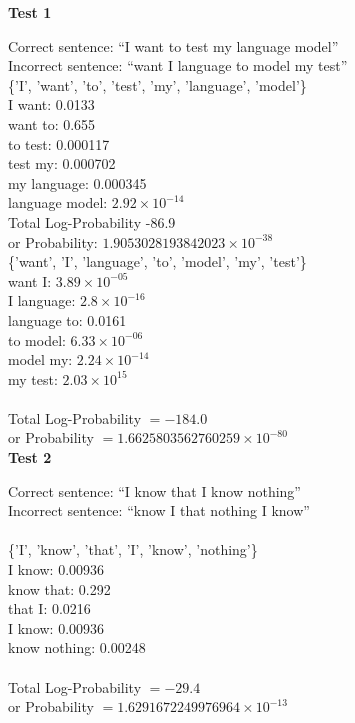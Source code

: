 \documentclass[12pt]{article}
\begin{document}
\textbf{Test 1}

Correct sentence: \enquote{I want to test my language model} \\
Incorrect sentence: \enquote{want I language to model my test} \\


\{'I', 'want', 'to', 'test', 'my', 'language', 'model'\} \\
I want: 0.0133 \\
want to: 0.655 \\
to test: 0.000117 \\
test my: 0.000702 \\
my language: 0.000345 \\
language model: $2.92 \times 10^{-14}$
\\

 Total Log-Probability -86.9 \\
or Probability: $1.9053028193842023 \times 10^{-38} $ \\

\{'want', 'I', 'language', 'to', 'model', 'my', 'test'\} \\
want I: $3.89 \times 10^{-05}$ \\
I language: $2.8\times 10^{-16}$ \\
language to: 0.0161 \\
to model: $6.33\times 10^{-06}$ \\
model my: $2.24\times 10^{-14}$ \\
my test: $2.03\times 10^{15}$ \\
\\
 Total Log-Probability $= -184.0$ \\
or Probability $= 1.6625803562760259 \times 10^{-80}$
\\
\textbf{Test 2}

Correct sentence: \enquote{I know that I know nothing} \\
Incorrect sentence: \enquote{know I that nothing I know} \\
\\
\{'I', 'know', 'that', 'I', 'know', 'nothing'\} \\
I know: 0.00936 \\
know that: 0.292 \\
that I: 0.0216 \\
I know: 0.00936 \\
know nothing: 0.00248 \\
\\
Total Log-Probability $= -29.4$ \\
or Probability $= 1.6291672249976964\times 10^{-13}$ \\
\end{document}
